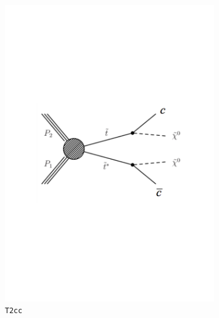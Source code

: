 \begin{figure}[h!]
  \centering
  \begin{subfigure}[b]{0.46\textwidth}
    \includegraphics[width=\textwidth]{Figs/feynman/T2cc_feynman.pdf}
    \caption{\texttt{T2cc}}
    \label{fig:t2cc_feyn}
  \end{subfigure}
  \begin{subfigure}[b]{0.46\textwidth}

\end{subfigure}
\end{figure}
